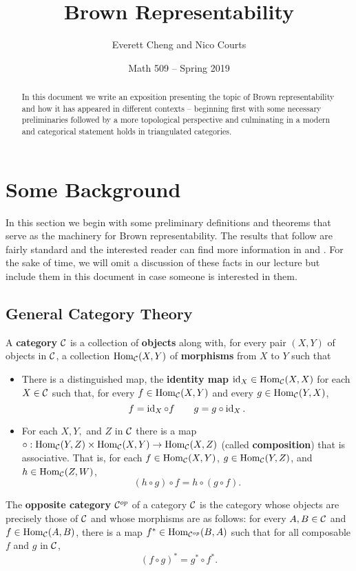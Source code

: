 \documentclass[12pt]{article}
\begin{document}
\title{Brown Representability\vspace{-1ex}}
\author{Everett Cheng and Nico Courts}
\date{Math 509 -- Spring 2019}
\maketitle

\renewcommand{\abstractname}{Introduction}
\begin{abstract}
  In this document we write an exposition presenting the topic of Brown representability and how it has appeared in different contexts -- beginning first with some necessary preliminaries followed by a more topological perspective and culminating in a modern and categorical statement holds in triangulated categories.
\end{abstract}
\tableofcontents

\section{Some Background}
In this section we begin with some preliminary definitions and theorems that serve as the machinery for Brown representability. 
The results that follow are fairly standard and the interested reader can find more information in \cite{neeman-book} and \cite{riehl}.
For the sake of time, we will omit a discussion of these facts in our lecture but include them in this document in case someone is interested in them.
\subsection{General Category Theory}
\begin{defn}
  A \textbf{category} $\mathcal{C}$ is a collection of \textbf{objects} along with, for every pair $(X,Y)$ of objects in $\mathcal{C}$, a collection $\operatorname{Hom}_{\mathcal{C}}(X,Y)$ of \textbf{morphisms} from $X$ to $Y$ such that
  \begin{itemize}
    \item There is a distinguished map, the \textbf{identity map} $\operatorname{id}_X\in\operatorname{Hom}_{\mathcal{C}}(X,X)$ for each $X\in\mathcal{C}$ such that, for every $f\in\operatorname{Hom}_{\mathcal{C}}(X,Y)$ and every $g\in\operatorname{Hom}_{\mathcal{C}}(Y,X)$,
    \[f=\operatorname{id}_X\circ f\qquad g=g\circ\operatorname{id}_X.\]
    \item For each $X,Y,$ and $Z$ in $\mathcal{C}$ there is a map $\circ:\operatorname{Hom}_{\mathcal{C}}(Y,Z)\times\operatorname{Hom}_{\mathcal{C}}(X,Y)\to\operatorname{Hom}_{\mathcal{C}}(X,Z)$ (called \textbf{composition}) that is associative. That is, for each $f\in\operatorname{Hom}_{\mathcal{C}}(X,Y)$, $g\in\operatorname{Hom}_{\mathcal{C}}(Y,Z)$, and $h\in\operatorname{Hom}_{\mathcal{C}}(Z,W)$,
    \[(h\circ g)\circ f=h\circ(g\circ f).\]
  \end{itemize}
\end{defn}
\begin{defn}
	The \textbf{opposite category} $\mathcal{C}^{op}$ of a category $\mathcal{C}$ is the category whose objects are 
	precisely those of $\mathcal{C}$ and whose morphisms are as follows: for every $A,B\in\mathcal{C}$ and $f\in\operatorname{Hom}_{\mathcal{C}}(A,B)$,
	there is a map $f^\ast\in\operatorname{Hom}_{\mathcal{C}^{op}}(B,A)$ such that for all composable $f$ and $g$ in $\mathcal{C}$,
	\[(f\circ g)^\ast=g^\ast\circ f^\ast.\]
\end{defn}
\end{document}
